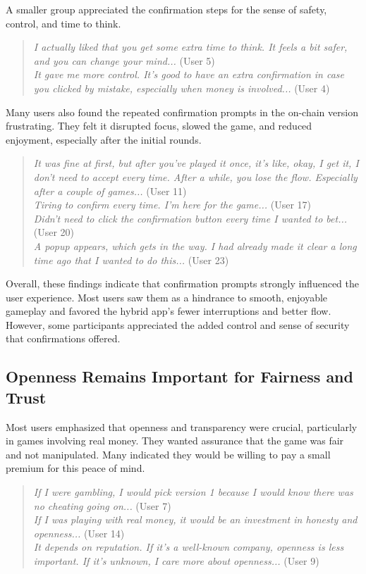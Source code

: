 \documentclass[10pt,conference]{IEEEtran}
\begin{document}
A smaller group appreciated the confirmation steps for the sense of safety, control, and time to
think.

\begin{quote}
\textit{I actually liked that you get some extra time to think. It feels a bit safer, and you can
change your mind...} (User 5)\\
\textit{It gave me more control. It’s good to have an extra confirmation in case you clicked by
mistake, especially when money is involved...} (User 4)
\end{quote}

Many users also found the repeated confirmation prompts in the on-chain version frustrating. They felt it disrupted focus, slowed the game, and reduced enjoyment, especially after the initial rounds.

\begin{quote}
\textit{It was fine at first, but after you’ve played it once, it’s like, okay, I get it, I don’t need to accept every time. After a while, you lose the flow. Especially after a couple of games...} (User 11)\\
\textit{Tiring to confirm every time. I’m here for the game...} (User 17)\\
\textit{Didn’t need to click the confirmation button every time I wanted to bet...} (User 20)\\
\textit{A popup appears, which gets in the way. I had already made it clear a long time ago that I wanted to do this...} (User 23)
\end{quote}

Overall, these findings indicate that confirmation prompts strongly influenced the user experience. Most users saw them as a hindrance to smooth, enjoyable gameplay and favored the hybrid app’s fewer interruptions and better flow. However, some participants appreciated the added control and sense of security that confirmations offered.

\subsection{Openness Remains Important for Fairness and Trust}

Most users emphasized that openness and transparency were crucial, particularly in games involving real money. They wanted assurance that the game was fair and not manipulated. Many indicated they would be willing to pay a small premium for this peace of mind.

\begin{quote}
\textit{If I were gambling, I would pick version 1 because I would know there was no cheating
going on...} (User 7)\\
\textit{If I was playing with real money, it would be an investment in honesty and openness...} (User 14)\\
\textit{It depends on reputation. If it’s a well-known company, openness is less important. If it’s unknown, I care more about openness...} (User 9)
\end{quote}
\end{document}
